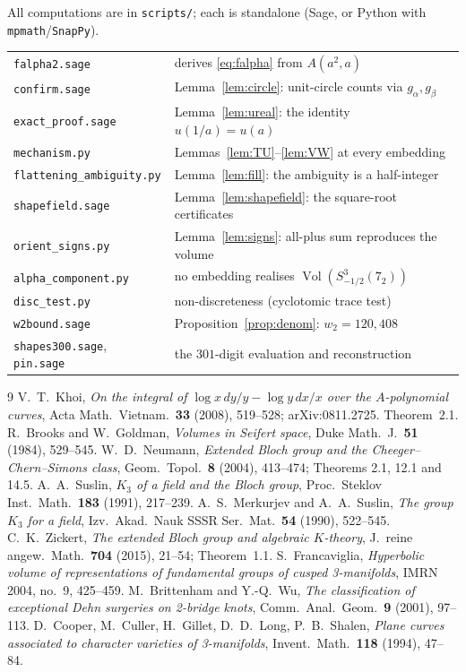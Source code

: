 \documentclass[11pt]{article}
\theoremstyle{remark}
\DeclareMathOperator{\Vol}{Vol}
\begin{document}
All computations are in \texttt{scripts/}; each is standalone
(Sage, or Python with \texttt{mpmath}/\texttt{SnapPy}).

\begin{center}
\begin{tabular}{ll}
\hline
\texttt{falpha2.sage} & derives \eqref{eq:falpha} from $A(a^2,a)$\\
\texttt{confirm.sage} & Lemma~\ref{lem:circle}: unit-circle counts via $g_\alpha,g_\beta$\\
\texttt{exact\_proof.sage} & Lemma~\ref{lem:ureal}: the identity $u(1/a)=u(a)$\\
\texttt{mechanism.py} & Lemmas~\ref{lem:TU}--\ref{lem:VW} at every embedding\\
\texttt{flattening\_ambiguity.py} & Lemma~\ref{lem:fill}: the ambiguity is a half-integer\\
\texttt{shapefield.sage} & Lemma~\ref{lem:shapefield}: the square-root certificates\\
\texttt{orient\_signs.py} & Lemma~\ref{lem:signs}: all-plus sum reproduces the volume\\
\texttt{alpha\_component.py} & no embedding realises $\Vol(S^3_{-1/2}(7_2))$\\
\texttt{disc\_test.py} & non-discreteness (cyclotomic trace test)\\
\texttt{w2bound.sage} & Proposition~\ref{prop:denom}: $w_2=120,408$\\
\texttt{shapes300.sage}, \texttt{pin.sage} & the $301$-digit evaluation and reconstruction\\
\hline
\end{tabular}
\end{center}

\begin{thebibliography}{9}
 V.~T.~Khoi, \emph{On the integral of $\log x\,dy/y-\log y\,dx/x$
over the $A$-polynomial curves}, Acta Math.\ Vietnam.\ \textbf{33} (2008),
519--528; arXiv:0811.2725. Theorem~2.1.
 R.~Brooks and W.~Goldman, \emph{Volumes in Seifert space},
Duke Math.\ J.\ \textbf{51} (1984), 529--545.
 W.~D.~Neumann, \emph{Extended Bloch group and the
Cheeger--Chern--Simons class}, Geom.\ Topol.\ \textbf{8} (2004), 413--474;
Theorems 2.1, 12.1 and 14.5.
 A.~A.~Suslin, \emph{$K_3$ of a field and the Bloch group},
Proc.\ Steklov Inst.\ Math.\ \textbf{183} (1991), 217--239.
 A.~S.~Merkurjev and A.~A.~Suslin, \emph{The group $K_3$ for a
field}, Izv.\ Akad.\ Nauk SSSR Ser.\ Mat.\ \textbf{54} (1990), 522--545.
 C.~K.~Zickert, \emph{The extended Bloch group and algebraic
$K$-theory}, J.\ reine angew.\ Math.\ \textbf{704} (2015), 21--54; Theorem~1.1.
 S.~Francaviglia, \emph{Hyperbolic volume of representations of
fundamental groups of cusped 3-manifolds}, IMRN 2004, no.~9, 425--459.
 M.~Brittenham and Y.-Q.~Wu, \emph{The classification of exceptional
Dehn surgeries on 2-bridge knots}, Comm.\ Anal.\ Geom.\ \textbf{9} (2001),
97--113.
 D.~Cooper, M.~Culler, H.~Gillet, D.~D.~Long, P.~B.~Shalen,
\emph{Plane curves associated to character varieties of 3-manifolds},
Invent.\ Math.\ \textbf{118} (1994), 47--84.
\end{thebibliography}
\end{document}
